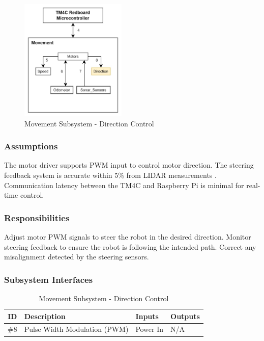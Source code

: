 \begin{figure}[h!]
	\centering
 	\includegraphics[width=0.45\textwidth]{images/movement/direction.jpg}
 \caption{Movement Subsystem - Direction Control} %
\end{figure}

\subsubsection{Assumptions}
The motor driver supports PWM input to control motor direction. The steering feedback system is accurate within 5\% from LIDAR measurements \cite{Epton2012}. Communication latency between the TM4C and Raspberry Pi is minimal for real-time control.

\subsubsection{Responsibilities}
Adjust motor PWM signals to steer the robot in the desired direction. Monitor steering feedback to ensure the robot is following the intended path. Correct any misalignment detected by the steering sensors.

\subsubsection{Subsystem Interfaces}

\begin {table}[H]
\caption {Movement Subsystem - Direction Control} 
\begin{center}
    \begin{tabular}{ | p{1cm} | p{6cm} | p{3cm} | p{3cm} |}
    \hline
    ID & Description & Inputs & Outputs \\ \hline
    \#8 & Pulse Width Modulation (PWM) & Power In & N/A \\ \hline
    \end{tabular}
\end{center}
\end{table}

